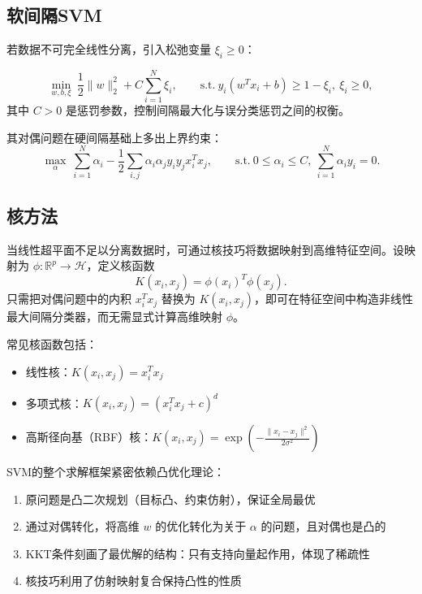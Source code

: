 \subsection{软间隔SVM}

若数据不可完全线性分离，引入松弛变量 $\xi_i \geq 0$：

\begin{definition}[软间隔SVM]
\[
\min_{w, b, \xi}\ \frac{1}{2}\|w\|_2^2 + C\sum_{i=1}^{N} \xi_i,\qquad
\text{s.t.}\ y_i(w^T x_i + b) \geq 1 - \xi_i,\ \xi_i \geq 0,
\]
其中 $C > 0$ 是惩罚参数，控制间隔最大化与误分类惩罚之间的权衡。
\end{definition}

其对偶问题在硬间隔基础上多出上界约束：
\[
\max_{\alpha}\ \sum_{i=1}^{N} \alpha_i - \frac{1}{2}\sum_{i,j} \alpha_i \alpha_j y_i y_j x_i^T x_j,\qquad
\text{s.t.}\ 0 \leq \alpha_i \leq C,\ \sum_{i=1}^{N} \alpha_i y_i = 0.
\]

\subsection{核方法}

当线性超平面不足以分离数据时，可通过核技巧将数据映射到高维特征空间。设映射为 $\phi: \mathbb{R}^p \to \mathcal{H}$，定义核函数
\[
K(x_i, x_j) = \phi(x_i)^T \phi(x_j).
\]
只需把对偶问题中的内积 $x_i^T x_j$ 替换为 $K(x_i, x_j)$，即可在特征空间中构造非线性最大间隔分类器，而无需显式计算高维映射 $\phi$。

常见核函数包括：
\begin{itemize}
    \item 线性核：$K(x_i, x_j) = x_i^T x_j$
    \item 多项式核：$K(x_i, x_j) = (x_i^T x_j + c)^d$
    \item 高斯径向基（RBF）核：$K(x_i, x_j) = \exp\!\left(-\frac{\|x_i - x_j\|^2}{2\sigma^2}\right)$
\end{itemize}

\begin{conceptbox}[SVM与凸优化的联系]
SVM的整个求解框架紧密依赖凸优化理论：
\begin{enumerate}[label=(\arabic*)]
    \item 原问题是凸二次规划（目标凸、约束仿射），保证全局最优
    \item 通过对偶转化，将高维 $w$ 的优化转化为关于 $\alpha$ 的问题，且对偶也是凸的
    \item KKT条件刻画了最优解的结构：只有支持向量起作用，体现了稀疏性
    \item 核技巧利用了仿射映射复合保持凸性的性质
\end{enumerate}
\end{conceptbox}

